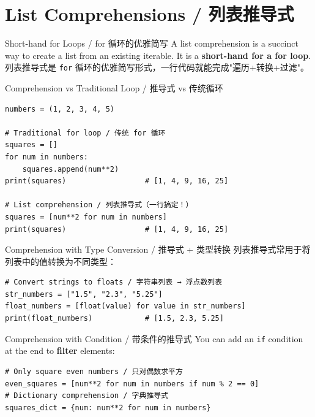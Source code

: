 \documentclass[11pt,a4paper]{article}
\begin{document}
\section{List Comprehensions / 列表推导式}

\begin{concept}{Short-hand for Loops / for 循环的优雅简写}
    A list comprehension is a succinct way to create a list from an existing iterable. It is a \textbf{short-hand for a for loop}. \\
    列表推导式是 \texttt{for} 循环的优雅简写形式，一行代码就能完成"遍历+转换+过滤"。
\end{concept}

\begin{examplebox}{Comprehension vs Traditional Loop / 推导式 vs 传统循环}
\begin{lstlisting}
numbers = (1, 2, 3, 4, 5)

# Traditional for loop / 传统 for 循环
squares = []
for num in numbers:
    squares.append(num**2)
print(squares)                  # [1, 4, 9, 16, 25]

# List comprehension / 列表推导式（一行搞定！）
squares = [num**2 for num in numbers]
print(squares)                  # [1, 4, 9, 16, 25]
\end{lstlisting}
\end{examplebox}

\begin{examplebox}{Comprehension with Type Conversion / 推导式 + 类型转换}
    列表推导式常用于将列表中的值转换为不同类型：
\begin{lstlisting}
# Convert strings to floats / 字符串列表 → 浮点数列表
str_numbers = ["1.5", "2.3", "5.25"]
float_numbers = [float(value) for value in str_numbers]
print(float_numbers)            # [1.5, 2.3, 5.25]
\end{lstlisting}
\end{examplebox}

\begin{concept}{Comprehension with Condition / 带条件的推导式}
    You can add an \texttt{if} condition at the end to \textbf{filter} elements:
\begin{lstlisting}
# Only square even numbers / 只对偶数求平方
even_squares = [num**2 for num in numbers if num % 2 == 0]
# Dictionary comprehension / 字典推导式
squares_dict = {num: num**2 for num in numbers}
    \end{lstlisting}
\end{concept}
\end{document}
